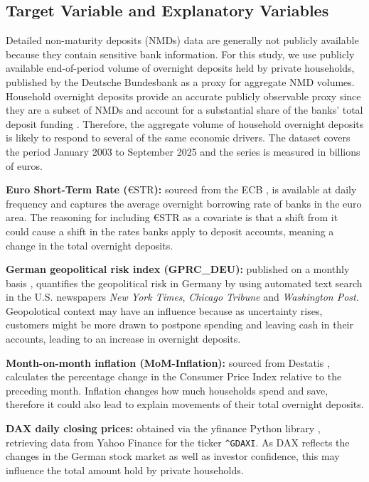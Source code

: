 \documentclass[11pt,a4paper]{article}
\begin{document}
\subsection{Target Variable and Explanatory Variables}
Detailed non-maturity deposits (NMDs) data are generally not publicly available because they contain sensitive bank information. For this study, we use publicly available end-of-period volume of overnight deposits held by private households, published by the Deutsche Bundesbank \citep{bundesbank_data} as a proxy for aggregate NMD volumes. Household overnight deposits provide an accurate publicly observable proxy since they are a subset of NMDs and account for a substantial share of the banks' total deposit funding \citep{bundesbank2024financing}. Therefore, the aggregate volume of household overnight deposits is likely to respond to several of the same economic drivers. The dataset covers the period January 2003 to September 2025 and the series is measured in billions of euros. 


\textbf{Euro Short-Term Rate ($\text{€STR}$):} sourced from the ECB
\citep{ecb_estr}, is available at daily frequency and captures
the average overnight borrowing rate of banks in the euro area. The reasoning for including $\text{€STR}$ as a covariate is that a shift from it could cause a shift in the rates banks apply to deposit accounts, meaning a change in the total overnight deposits. 

\textbf{German geopolitical risk index (GPRC\_DEU):} published on a monthly basis \citep{gpr_index}, quantifies the geopolitical risk in Germany by using automated text search in the U.S. newspapers \textit{New York Times}, \textit{Chicago Tribune} and \textit{Washington Post}. Geopolotical context may have an influence because as uncertainty rises, customers might be more drawn to postpone spending and leaving cash in their accounts, leading to an increase in overnight deposits.

\textbf{Month-on-month inflation (MoM-Inflation):}
 sourced from Destatis \citep{destatis_inflation}, calculates the
percentage change in the Consumer Price Index relative to the
preceding month. Inflation changes how much households spend and save, therefore it could also lead to explain movements of their total overnight deposits. 


\textbf{DAX daily closing prices:} obtained via the yfinance Python library  \citep{yfinance}, retrieving data from Yahoo Finance \citep{yahoo_finance_dax} for the ticker \texttt{\^{}GDAXI}. As DAX reflects the changes in the German stock market as well as investor confidence, this may influence the total amount hold by private households.
\end{document}
